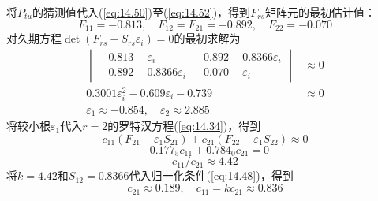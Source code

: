 \begin{examplebox}
        将$P_{tu}$的猜测值代入(\ref{eq:14.50})至(\ref{eq:14.52})，得到$F_{rs}$矩阵元的最初估计值：
        \begin{equation*}
            F_{11} = -0.813, \quad F_{12} = F_{21} = -0.892, \quad F_{22} = -0.070
        \end{equation*}
        对久期方程$\det \left(F_{rs} - S_{rs} \varepsilon_i\right) = 0$的最初求解为
        \begin{equation*}
            \begin{aligned}
                \begin{vmatrix}
                    -0.813 - \varepsilon_i & -0.892 - 0.8366 \varepsilon_i \\
                    -0.892 - 0.8366 \varepsilon_i & -0.070 - \varepsilon_i
                \end{vmatrix} &\approx  0 \\
                0.3001 \varepsilon_i^2 - 0.609 \varepsilon_i - 0.739 &\approx  0 \\
                \varepsilon_1 \approx  -0.854, \quad \varepsilon_2 \approx  2.885  
            \end{aligned}
        \end{equation*}
        将较小根$\varepsilon_1$代入$r=2$的罗特汉方程(\ref{eq:14.34})，得到
        \begin{equation*}
            c_{11} \left(F_{21} - \varepsilon_1 S_{21}\right) + c_{21} \left(F_{22} - \varepsilon_1 S_{22}\right) \approx 0
        \end{equation*}
        \begin{equation*}
            -0.177_5 c_{11} + 0.784_0 c_{21} = 0
        \end{equation*}
        \begin{equation*}
            c_{11} / c_{21} \approx 4.42
        \end{equation*}
        将$k = 4.42$和$S_{12} = 0.8366$代入归一化条件(\ref{eq:14.48})，得到
        \begin{equation*}
            c_{21} \approx 0.189, \quad c_{11} = kc_{21} \approx 0.836
        \end{equation*}


\end{examplebox}
